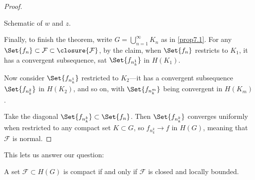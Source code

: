 \begin{proof}
\begin{marginfigure}
		\caption{\label{thm710:fig} Schematic of $w$ and $z$.}
	\end{marginfigure}

	Finally, to finish the theorem, write $G = \bigcup\limits_{n = 1}^\infty K_n$ as in \autoref{prop7.1}.
	For any $\Set{f_n} \subset \mathcal{F} \subset \closure{\mathcal{F}}$, by the claim, when $\Set{f_n}$ restricts to $K_1$, it has a convergent subsequence, sat $\Set{f_{n_k^1}}$ in $H(K_1)$.

	Now consider $\Set{f_{n_k^1}}$ restricted to $K_2$---it has a convergent subsequence $\Set{f_{n_k^2}}$ in $H(K_2)$, and so on, with $\Set{f_{n_k^m}}$ being convergent in $H(K_m)$.

	Take the diagonal $\Set{f_{n_k^k}} \subset \Set{f_n}$.
	Then $\Set{f_{n_k^k}}$ converges uniformly when restricted to any compact set $K \subset G$, so $f_{n_k^k} \to f$ in $H(G)$, meaning that $\mathcal{F}$ is normal.
\end{proof}

This lets us answer our question:

\begin{corollary}\label{cor7.11}
	A set $\mathcal{F} \subset H(G)$ is compact if and only if $\mathcal{F}$ is closed and locally bounded.
\end{corollary}
